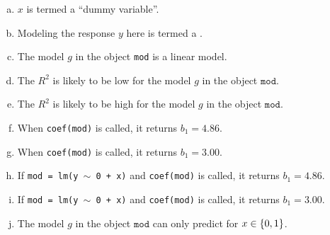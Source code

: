 \documentclass[12pt]{article}
\begin{document}
\begin{enumerate}[(a)]
\item $x$ is termed a ``dummy variable''.
\item Modeling the response $y$ here is termed a .
\item The model $g$ in the object \texttt{mod} is a linear model.
\item The $R^2$ is likely to be low for the model $g$ in the object $\texttt{mod}$.
\item The $R^2$ is likely to be high for the model $g$ in the object $\texttt{mod}$.
\item When \texttt{coef(mod)} is called, it returns $b_1 = 4.86$.
\item When \texttt{coef(mod)} is called, it returns $b_1 = 3.00$.
\item If \texttt{mod = lm(y $\sim$ 0 + x)} and \texttt{coef(mod)} is called, it returns $b_1 = 4.86$.
\item If \texttt{mod = lm(y $\sim$ 0 + x)} and \texttt{coef(mod)} is called, it returns $b_1 = 3.00$.
\item The model $g$ in the object $\texttt{mod}$ can only predict for $x \in \left\{0,1\right\}$.
\end{enumerate}
\eenum\pagebreak
\end{document}
